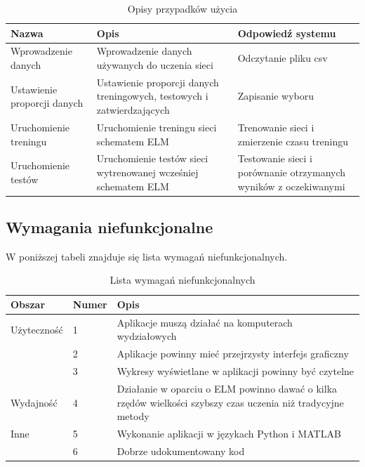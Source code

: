 \documentclass{article}
\begin{document}
\begin{table}[H]
\caption{Opisy przypadków użycia}
\begin{tabular}{|p{3.4cm}|p{5cm}|p{4cm}|}
\hline
\textbf{Nazwa} & \textbf{Opis} & \textbf{Odpowiedź systemu} \\
\hline
Wprowadzenie danych & Wprowadzenie danych używanych do uczenia sieci & Odczytanie pliku csv \\ \hline
Ustawienie proporcji danych & Ustawienie proporcji danych treningowych, testowych i zatwierdzających & Zapisanie wyboru \\ \hline
Uruchomienie treningu & Uruchomienie treningu sieci schematem ELM & Trenowanie sieci i zmierzenie czasu treningu \\ \hline
Uruchomienie testów & Uruchomienie testów sieci wytrenowanej wcześniej schematem ELM & Testowanie sieci i porównanie otrzymanych wyników z oczekiwanymi \\
\hline
\end{tabular}
\end{table}
\clearpage
\subsection{Wymagania niefunkcjonalne}
W poniższej tabeli znajduje się lista wymagań niefunkcjonalnych.
\begin{table}[H]
\caption{Lista wymagań niefunkcjonalnych}
\begin{tabular}{|l|l|p{9.4cm}|}
\hline
\textbf{Obszar} & \textbf{Numer} & \textbf{Opis} \\
\hline
Użyteczność & 1 & Aplikacje muszą działać na komputerach wydziałowych \\
 & 2 & Aplikacje powinny mieć przejrzysty interfejs graficzny \\
 & 3 & Wykresy wyświetlane w aplikacji powinny być czytelne \\
\hline
Wydajność & 4 & Działanie w oparciu o ELM powinno dawać o kilka rzędów wielkości szybszy czas uczenia niż tradycyjne metody \\
\hline 
Inne & 5 & Wykonanie aplikacji w językach Python i MATLAB \\
& 6 & Dobrze udokumentowany kod \\
\hline
\end{tabular}
\end{table}
\end{document}
